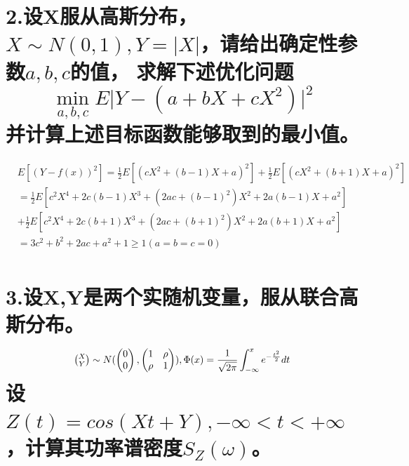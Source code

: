 \documentclass[UTF8]{ctexart}
\begin{document}
\section*{2.设X服从高斯分布，$X\sim N(0,1),Y=\lvert X\rvert$，请给出确定性参数$a,b,c$的值，
  求解下述优化问题
  \begin{equation*}
    \mathop{min}\limits_{a,b,c}E\lvert Y-(a+bX+cX^2)\rvert^2
  \end{equation*}
  并计算上述目标函数能够取到的最小值。
 }
\begin{equation*}
  \begin{aligned}
     & E[(Y-f(x))^2]=\frac{1}{2}E[(cX^2+(b-1)X+a)^2]+\frac{1}{2}E[(cX^2+(b+1)X+a)^2] \\
     & =\frac{1}{2}E[c^2X^4+2c(b-1)X^3+(2ac+(b-1)^2)X^2+2a(b-1)X+a^2]                \\
     & +\frac{1}{2}E[c^2X^4+2c(b+1)X^3+(2ac+(b+1)^2)X^2+2a(b+1)X+a^2]                \\
     & =3c^2+b^2+2ac+a^2+1\geq1(a=b=c=0)                                             \\
  \end{aligned}
\end{equation*}
\section*{3.设X,Y是两个实随机变量，服从联合高斯分布。
  \begin{equation*}
    \tbinom{X}{Y}\sim N(
    \begin{pmatrix}
      0 \\0
    \end{pmatrix},
    \begin{pmatrix}
      1    & \rho \\
      \rho & 1
    \end{pmatrix}
    ),
    \Phi(x)=\frac{1}{\sqrt{2\pi}}\int_{-\infty}^xe^{-\frac{t^2}{2}}dt
  \end{equation*}
  设$Z(t)=cos(Xt+Y),-\infty<t<+\infty$，计算其功率谱密度$S_Z(\omega)$。
 }
\end{document}
